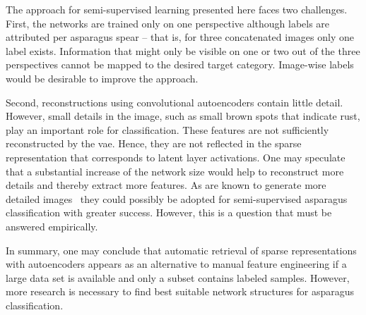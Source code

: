 \bigskip
The approach for semi-supervised learning presented here faces two challenges. First, the networks are trained only on one perspective although labels are attributed per asparagus spear -- that is, for three concatenated images only one label exists. Information that might only be visible on one or two out of the three perspectives cannot be mapped to the desired target category. Image-wise labels would be desirable to improve the approach.

Second, reconstructions using convolutional autoencoders contain little detail. However, small details in the image, such as small brown spots that indicate rust, play an important role for classification. These features are not sufficiently reconstructed by the \acrshort{vae}. Hence, they are not reflected in the sparse representation that corresponds to latent layer activations. One may speculate that a substantial increase of the network size would help to reconstruct more details and thereby extract more features. As  are known to generate more detailed images~\citep{bao2017cvae} they could possibly be adopted for semi-supervised asparagus classification with greater success. However, this is a question that must be answered empirically.

\bigskip
In summary, one may conclude that automatic retrieval of sparse representations with autoencoders appears as an alternative to manual feature engineering if a large data set is available and only a subset contains labeled samples. However, more research is necessary to find best suitable network structures for asparagus classification.